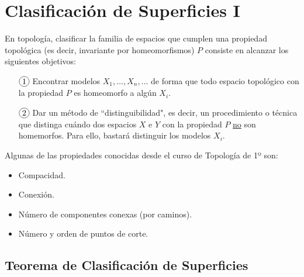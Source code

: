 \documentclass[GTS.tex]{subfiles}
\begin{document}

\renewcommand\chaptername{\Huge Tema}

\titleformat{\chapter}[display]
    {\normalfont\huge\bfseries}{\chaptertitlename\ \thechapter}{10pt}{\Huge}
\titlespacing*{\chapter}{0pt}{-1cm}{10pt}

  

\setcounter{chapter}{1}

\chapter{Clasificación de Superficies I}
En topología, clasificar la familia de espacios que cumplen una propiedad topológica (es decir, invariante por homeomorfismos) $P$ consiste en alcanzar los siguientes objetivos:
\begin{enumerate}
\item[$\circled{1}$] Encontrar modelos $X_1,\dots,X_n,\dots$ de forma que todo espacio topológico con la propiedad $P$ es homeomorfo a algún $X_i$.
\item[$\circled{2}$] Dar un método de ``distinguibilidad", es decir, un procedimiento o técnica que distinga cuándo dos espacios $X$ e $Y$ con la propiedad $P$ \underline{no} son homemorfos. Para ello, bastará distinguir los modelos $X_i$.
\end{enumerate}
Algunas de las propiedades conocidas desde el curso de Topología de 1º son:
\begin{itemize}
\item Compacidad.
\item Conexión.
\item Número de componentes conexas (por caminos).
\item Número y orden de puntos de corte.
\end{itemize}


\section{Teorema de Clasificación de Superficies}
\end{document}
